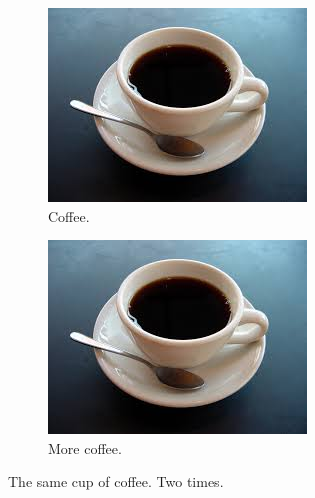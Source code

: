 \documentclass{article}
\begin{document}
\begin{figure}[h!]
  \centering
  \begin{subfigure}[b]{0.4\linewidth}
    \includegraphics[width=\linewidth]{coffee.jpg}
    \caption{Coffee.}
  \end{subfigure}
  \begin{subfigure}[b]{0.4\linewidth}
    \includegraphics[width=\linewidth]{coffee.jpg}
    \caption{More coffee.}
  \end{subfigure}
  \caption{The same cup of coffee. Two times.}
  \label{fig:coffee}
\end{figure}
\end{document}
